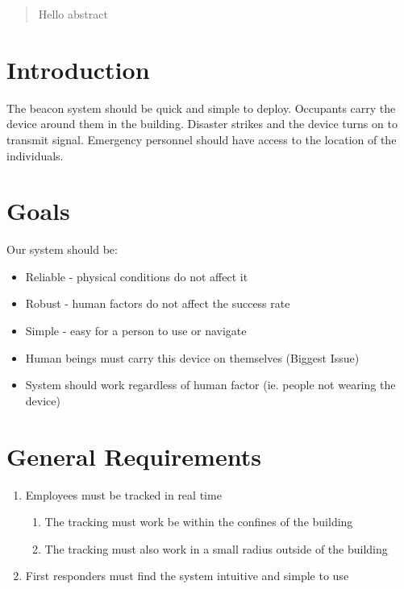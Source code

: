 \documentclass[12pt]{article}
\begin{document}
\maketitle

\begin{abstract}
	Hello abstract

\end{abstract}

\section{Introduction}
The beacon system should be quick and simple to deploy. Occupants carry the device around them in the building. Disaster strikes and the device turns on to transmit signal. Emergency personnel should have access to the location of the individuals.

\section{Goals}
	Our system should be:
	\begin{itemize}
		\item Reliable - physical conditions do not affect it
		\item Robust - human factors do not affect the success rate
		\item Simple - easy for a person to use or navigate
		\item Human beings must carry this device on themselves (Biggest Issue)
		\item System should work regardless of human factor (ie. people not wearing the device)
	\end{itemize}

\section{General Requirements}
	\begin{enumerate}
		\item Employees must be tracked in real time
			\begin{enumerate}
				\item The tracking must work be within the confines of the building
				\item The tracking must also work in a small radius outside of the building
			\end{enumerate}
		\item First responders must find the system intuitive and simple to use
	\end{enumerate}
\end{document}
